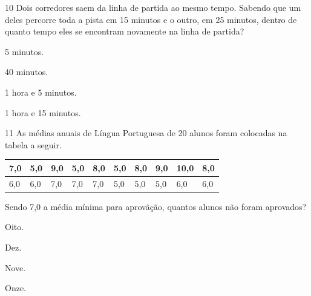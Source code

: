 \num{10} Dois corredores saem da linha de partida ao mesmo tempo. Sabendo que
um deles percorre toda a pista em 15 minutos e o outro, em 25 minutos,
dentro de quanto tempo eles se encontram novamente na linha de partida?

\begin{escolha}
\item 5 minutos.
\item 40 minutos.
\item 1 hora e 5 minutos.
\item 1 hora e 15 minutos.
\end{escolha}







\pagebreak

\num{11} As médias anuais de Língua Portuguesa de 20 alunos foram colocadas na tabela a seguir.


\begin{longtable}[]{@{}llllllllll@{}}
\toprule
7,0 & 5,0 & 9,0 & 5,0 & 8,0 & 5,0 & 8,0 & 9,0 & 10,0 &
8,0\tabularnewline
\midrule
\endhead
6,0 & 6,0 & 7,0 & 7,0 & 7,0 & 5,0 & 5,0 & 5,0 & 6,0 & 6,0\tabularnewline
\bottomrule
\end{longtable}

Sendo 7,0 a média mínima para aprovãção, quantos alunos não foram aprovados?

\begin{escolha}
\item Oito.
\item Dez.
\item Nove.
\item Onze.
\end{escolha}

